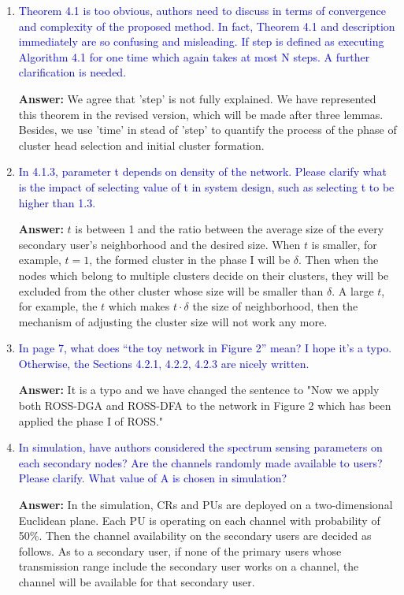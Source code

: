 \documentclass[10pt,a4paper]{article}
\begin{document}
\begin{enumerate}
\item \textcolor{blue}{  Theorem 4.1 is too obvious, authors need to discuss in terms of convergence and complexity of the proposed method. In fact, Theorem 4.1 and description immediately are so confusing and misleading. If step is defined as executing Algorithm 4.1 for one time which again takes at most N steps. A further clarification is needed.}

\textbf{Answer:} We agree that 'step' is not fully explained.
	We have represented this theorem in the revised version, which will be made after three lemmas.
	Besides, we use 'time' in stead of 'step' to quantify the process of the phase of cluster head selection and initial cluster formation.
	
	
\item \textcolor{blue}{  In 4.1.3, parameter t depends on density of the network. Please clarify what is the impact of selecting value of t in system design, such as selecting t to be higher than 1.3.}

\textbf{Answer:}	$t$ is between 1 and the ratio between the average size of the every secondary user's neighborhood and the desired size.
	When $t$ is smaller, for example, $t=1$, the formed cluster in the phase I will be $\delta$.
	Then when the nodes which belong to multiple clusters decide on their clusters, they will be excluded from the other cluster whose size will be smaller than $\delta$.
	A large $t$, for example, the $t$ which makes $t\cdot\delta$ the size of neighborhood, then the mechanism of adjusting the cluster size will not work any more.

    
\item \textcolor{blue}{  In page 7, what does “the toy network in Figure 2” mean? I hope it’s a typo. Otherwise, the Sections 4.2.1, 4.2.2, 4.2.3 are nicely written.}

\textbf{Answer:} It is a typo and we have changed the sentence to "Now we apply both ROSS-DGA and ROSS-DFA to the network in Figure 2 which has been applied the phase I of ROSS."
    
\item \textcolor{blue}{  In simulation, have authors considered the spectrum sensing parameters on each secondary nodes? Are the channels randomly made available to users? Please clarify. What value of A is chosen in simulation?}

\textbf{Answer:} In the simulation, CRs and PUs are deployed on a two-dimensional Euclidean plane. 
Each PU is operating on each channel with probability of 50\%.
Then the channel availability on the secondary users are decided as follows.
As to a secondary user, if none of the primary users whose transmission range include the secondary user works on a channel, the channel will be available for that secondary user. 


\end{enumerate}
\end{document}
